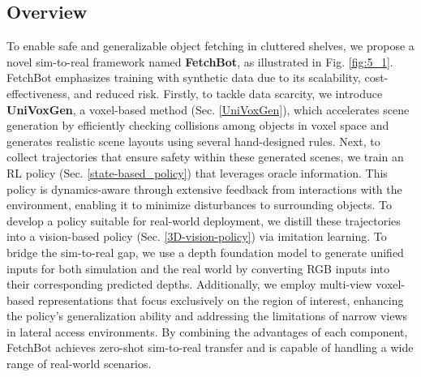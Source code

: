 \label{method}
\subsection{Overview}
To enable safe and generalizable object fetching in cluttered shelves, we propose a novel sim-to-real framework named \textbf{FetchBot}, as illustrated in Fig. \ref{fig:5_1}. FetchBot emphasizes training with synthetic data due to its scalability, cost-effectiveness, and reduced risk.
Firstly, to tackle data scarcity, we introduce \textbf{UniVoxGen}, a voxel-based method (Sec. \ref{UniVoxGen}), which accelerates scene generation by efficiently checking collisions among objects in voxel space and generates realistic scene layouts using several hand-designed rules.
Next, to collect trajectories that ensure safety within these generated scenes, we train an RL policy (Sec. \ref{state-based_policy}) that leverages oracle information. This policy is dynamics-aware through extensive feedback from interactions with the environment, enabling it to minimize disturbances to surrounding objects.
To develop a policy suitable for real-world deployment, we distill these trajectories into a vision-based policy (Sec. \ref{3D-vision-policy}) via imitation learning. To bridge the sim-to-real gap, we use a depth foundation model to generate unified inputs for both simulation and the real world by converting RGB inputs into their corresponding predicted depths. Additionally, we employ multi-view voxel-based representations that focus exclusively on the region of interest, enhancing the policy’s generalization ability and addressing the limitations of narrow views in lateral access environments.
By combining the advantages of each component, FetchBot achieves zero-shot sim-to-real transfer and is capable of handling a wide range of real-world scenarios.


